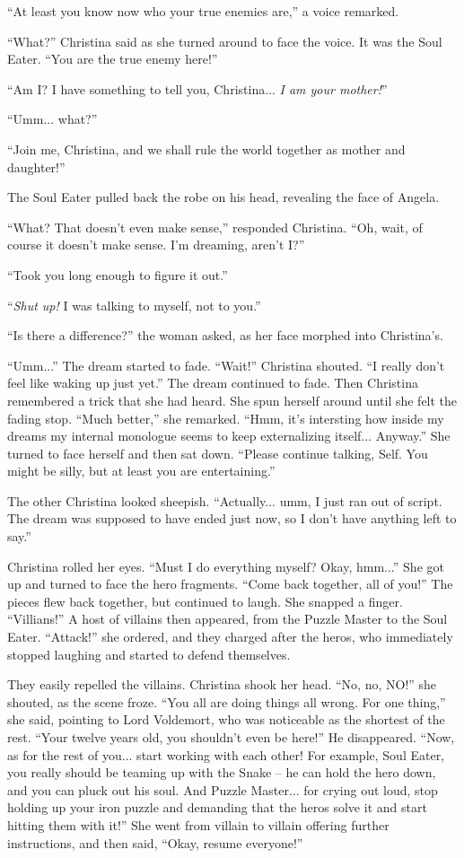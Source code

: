 \documentclass[showtrims,b6paper,draft,10pt]{memoir}
\begin{document}
``At least you know now who your true enemies are,'' a voice remarked.

``What?'' Christina said as she turned around to face the voice.  It was the Soul Eater.  ``You are the true enemy here!''

``Am I?  I have something to tell you, Christina... \emph{I am your mother!}''

``Umm... what?''

``Join me, Christina, and we shall rule the world together as mother and daughter!''

The Soul Eater pulled back the robe on his head, revealing the face of Angela.

``What?  That doesn't even make sense,'' responded Christina.  ``Oh, wait, of course it doesn't make sense.  I'm dreaming, aren't I?''

``Took you long enough to figure it out.''

``\emph{Shut up!}  I was talking to myself, not to you.''

``Is there a difference?''  the woman asked, as her face morphed into Christina's.

``Umm...''  The dream started to fade.  ``Wait!'' Christina shouted.  ``I really don't feel like waking up just yet.''  The dream continued to fade.  Then Christina remembered a trick that she had heard.  She spun herself around until she felt the fading stop. ``Much better,'' she remarked.  ``Hmm, it's intersting how inside my dreams my internal monologue seems to keep externalizing itself...  Anyway.''  She turned to face herself and then sat down.  ``Please continue talking, Self.  You might be silly, but at least you are entertaining.''

The other Christina looked sheepish.  ``Actually... umm, I just ran out of script.  The dream was supposed to have ended just now, so I don't have anything left to say.''

Christina rolled her eyes.  ``Must I do everything myself?  Okay, hmm...''  She got up and turned to face the hero fragments.  ``Come back together, all of you!''  The pieces flew back together, but continued to laugh.   She snapped a finger.  ``Villians!''  A host of villains then appeared, from the Puzzle Master to the Soul Eater.  ``Attack!''  she ordered, and they charged after the heros, who immediately stopped laughing and started to defend themselves.

They easily repelled the villains.  Christina shook her head.  ``No, no, NO!'' she shouted, as the scene froze.  ``You all are doing things all wrong.  For one thing,'' she said, pointing to Lord Voldemort, who was noticeable as the shortest of the rest.  ``Your twelve years old, you shouldn't even be here!''  He disappeared.  ``Now, as for the rest of you... start working with each other!  For example, Soul Eater, you really should be teaming up with the Snake -- he can hold the hero down, and you can pluck out his soul.  And Puzzle Master... for crying out loud, stop holding up your iron puzzle and demanding that the heros solve it and start hitting them with it!''  She went from villain to villain offering further instructions, and then said,  ``Okay, resume everyone!''
\end{document}
